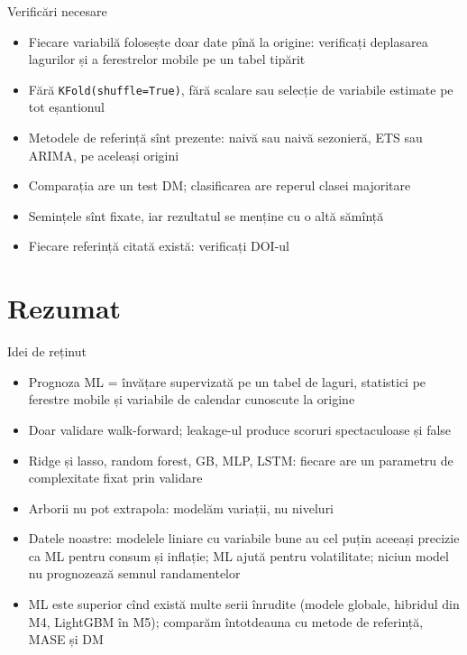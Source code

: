 \begin{frame}{Verificări necesare}
\itemsize{\small}
\begin{itemize}
    \item Fiecare variabilă folosește doar date pînă la origine: verificați deplasarea lagurilor și a ferestrelor mobile pe un tabel tipărit
    \item Fără \texttt{KFold(shuffle=True)}, fără scalare sau selecție de variabile estimate pe tot eșantionul
    \item Metodele de referință sînt prezente: naivă sau naivă sezonieră, ETS sau ARIMA, pe aceleași origini
    \item Comparația are un test DM; clasificarea are reperul clasei majoritare
    \item Semințele sînt fixate, iar rezultatul se menține cu o altă sămînță
    \item Fiecare referință citată există: verificați DOI-ul
\end{itemize}
\end{frame}


\section{Rezumat}

\begin{frame}{Idei de reținut}
\itemsize{\small}
\begin{itemize}
    \item Prognoza ML = învățare supervizată pe un tabel de laguri, statistici pe ferestre mobile și variabile de calendar cunoscute la origine
    \item Doar validare walk-forward; leakage-ul produce scoruri spectaculoase și false
    \item Ridge și lasso, random forest, GB, MLP, LSTM: fiecare are un parametru de complexitate fixat prin validare
    \item Arborii nu pot extrapola: modelăm variații, nu niveluri
    \item Datele noastre: modelele liniare cu variabile bune au cel puțin aceeași precizie ca ML pentru consum și inflație; ML ajută pentru volatilitate; niciun model nu prognozează semnul randamentelor
    \item ML este superior cînd există multe serii înrudite (modele globale, hibridul din M4, LightGBM în M5); comparăm întotdeauna cu metode de referință, MASE și DM
\end{itemize}
\end{frame}

